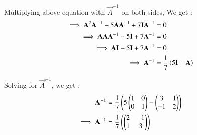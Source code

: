 
Multiplying above equation with $\vec{A}^{-1}$ on both sides, We get :
\begin{align}
\implies \mathbf{A}^2\mathbf{A}^{-1} - 5\mathbf{A}\mathbf{A}^{-1} + 7\mathbf{I}\mathbf{A}^{-1} &= 0 \\
\implies \mathbf{A}\mathbf{A}\mathbf{A}^{-1} - 5\mathbf{I} + 7\mathbf{A}^{-1} &= 0 \\
\implies \mathbf{A}\mathbf{I} - 5\mathbf{I} + 7\mathbf{A}^{-1} &= 0\\
\implies \mathbf{A}^{-1} &= \frac{1}{7}\left(5\mathbf{I} - \mathbf{A}\right)
\end{align}

Solving for $\vec{A}^{-1}$, we get :
\begin{align}
    \mathbf{A}^{-1} &= \frac{1}{7}\left(5\begin{pmatrix} 1 & 0\\ 0 & 1\end{pmatrix} - \begin{pmatrix} 3 & 1\\ -1 & 2\end{pmatrix}\right) \\
    \implies \mathbf{A}^{-1} &= \frac{1}{7}\left(\begin{pmatrix} 2 & -1\\ 1 & 3\end{pmatrix}\right)
\end{align}


